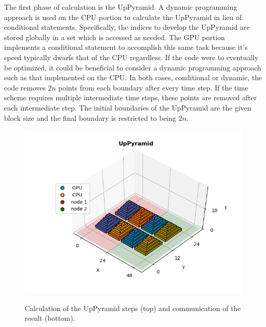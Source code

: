 \documentclass[review]{elsarticle}
\begin{document}
\par
The first phase of calculation is the UpPyramid. A dynamic programming approach is used on the CPU portion to calculate the UpPyramid in lieu of conditional statements. Specifically, the indices to develop the UpPyramid are stored globally in a set which is accessed as needed. The GPU portion implements a conditional statement to accomplish this same task because it's speed typically dwarfs that of the CPU regardless. If the code were to eventually be optimized, it could be beneficial to consider a dynamic programming approach such as that implemented on the CPU. In both cases, conditional or dynamic, the code removes $2n$ points from each boundary after every time step. If the time scheme requires multiple intermediate time steps, these points are removed after each intermediate step. The initial boundaries of the UpPyramid are the given block size and the final boundary is restricted to being $2n$.


\begin{figure}[h!]
    \centering
       \includegraphics{figs/UpPyramid.png}
    \label{fig:UP}
    \caption{Calculation of the UpPyramid steps (top) and communication of the result (bottom).}
\end{figure}
\end{document}
